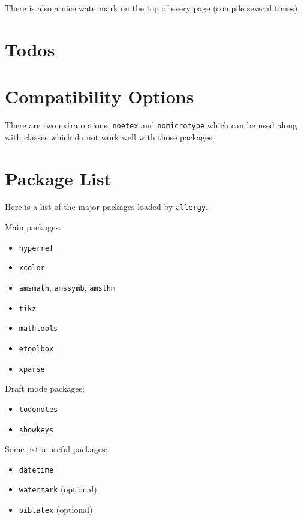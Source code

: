 \documentclass{scrartcl}
\begin{document}
There is also a nice watermark on the top of every page (compile several times).

\section{Todos}



\section{Compatibility Options}

There are two extra options, \lstinline|noetex| and \lstinline|nomicrotype| which can be used along with classes which do not work well with those packages.

\section{Package List}

Here is a list of the major packages loaded by \texttt{allergy}.

Main packages:
\begin{itemize}
\item \texttt{hyperref}
\item \texttt{xcolor}
\item \texttt{amsmath}, \texttt{amssymb}, \texttt{amsthm}
\item \texttt{tikz}
\item \texttt{mathtools}
\item \texttt{etoolbox}
\item \texttt{xparse}
\end{itemize}

Draft mode packages:
\begin{itemize}
\item \texttt{todonotes}
\item \texttt{showkeys}
\end{itemize}

Some extra useful packages:
\begin{itemize}
\item \texttt{datetime}
\item \texttt{watermark} (optional)
\item \texttt{biblatex} (optional)
\end{itemize}
\end{document}
